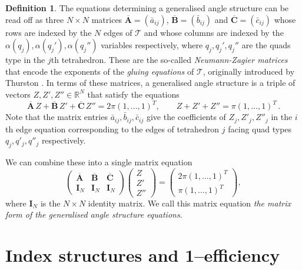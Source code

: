 \documentclass[12pt]{amsart}
\theoremstyle{definition}
\newtheorem{defn}[thm]{Definition}
\theoremstyle{remark}
\def\BR{\mathbb R}
\def\lbl{\label}
\newcommand{\CT}{\mathcal{T}}
\def\be{  \begin{equation} }
\def\ee{  \end{equation} }
\newcommand{\mb}{\mathbf}
\begin{document}
\begin{defn}\label{matrix equations}
The equations determining a generalised angle structure can be read off as three $N\times N$ matrices 
$\overline{\mb A}=(\bar a_{ij})$, $\overline{\mb B}=(\bar b_{ij})$ and $\overline{\mb C}=(\bar c_{ij})$
whose rows are indexed by the $N$ edges of $\CT$ and whose columns are 
indexed by the $\alpha(q_j) ,\alpha(q_j'),\alpha(q_j'')$ variables respectively, where $q_j, q_j', q_j''$ are the quads type in the $j$th tetrahedron.   These are the so-called 
{\em Neumann-Zagier matrices} that encode the exponents of the 
{\em gluing equations} of $\CT$, originally introduced by Thurston 
\cite{NZ,Th}. In terms of these matrices, a generalised angle structure is
a triple of vectors $Z, Z',  Z''  \in \BR^N$ that satisfy the equations
\be
\lbl{eq.angle1}
\overline{\mb A} \, Z + \overline{\mb B} \, Z' 
+ \overline{\mb C} \, Z'' = 2 \pi (1,\dots,1)^T,  \qquad   Z+Z'+Z''=\pi (1,\dots,1)^T \,.
\ee
Note that the matrix entries $\bar a_{ij},\bar b_{ij},\bar c_{ij}$ give the coefficients
of $Z_j,Z'_j,Z''_j$ in the $i$th edge equation corresponding to the edges of tetrahedron $j$
facing quad types $q_j,q'_j,q''_j$ respectively.

We can combine these into a single matrix equation
\be
\label{full_matrix_eqn}
\begin{pmatrix} \overline{\mb A} & \overline{\mb B} & \overline{\mb C} \\ 
\mb I_N & \mb I_N & \mb I_N 
\end{pmatrix} \begin{pmatrix}Z \\ 
Z'\\
Z'' 
\end{pmatrix} = 
\begin{pmatrix} 2 \pi (1,\dots,1)^T \\ \pi (1,\dots,1)^T \end{pmatrix},
\ee
where $\mb I_N$ is the $N\times N$ identity matrix. We call this matrix equation \emph{the matrix form of the generalised angle structure equations}.

\end{defn}


\section{Index structures and 1--efficiency}
\label{sec: index structures and 1-efficiency}
\end{document}
